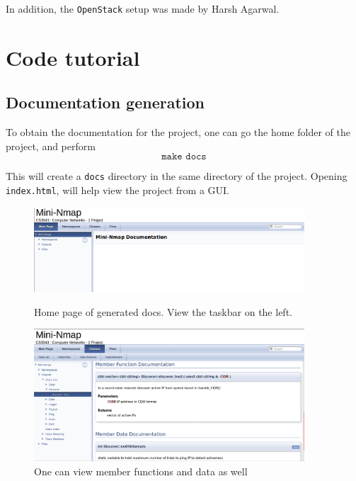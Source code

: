 \documentclass[12pt]{article}
\begin{document}
In addition, the \texttt{OpenStack} setup was made by Harsh Agarwal.

\section{Code tutorial}
\subsection{Documentation generation}
To obtain the documentation for the project, one can go the home folder of the project, and perform
\[\texttt{make docs}\]

This will create a \texttt{docs} directory in the same directory of the project. Opening \texttt{index.html}, will help view the project from a GUI.
\begin{figure}[H]
\begin{minipage}{0.475\linewidth}
\centering
\includegraphics[width=0.9\textwidth]{doc-gen-1.png}
\caption{Home page of generated docs. View the taskbar on the left.}
\end{minipage}
\hfill
\begin{minipage}{0.45\linewidth}
\centering
\includegraphics[width=0.9\textwidth]{doc-gen-2.png}
\caption{One can view member functions and data as well}
\end{minipage}
\end{figure}
\end{document}

